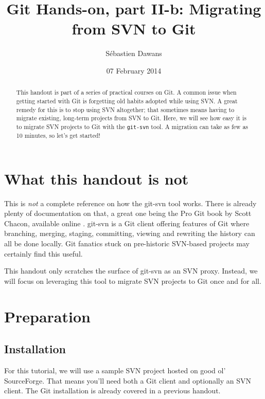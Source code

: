 \documentclass{../common/tufte-latex/tufte-handout}
\title{Git Hands-on, part II-b: Migrating from SVN to Git}
\author{S\'ebastien Dawans}
\date{07 February 2014} %
\begin{document}
\maketitle%

\begin{abstract}
\noindent
This handout is part of a series of practical courses on Git.
A common issue when getting started with Git is forgetting old habits adopted while using SVN.
A great remedy for this is to stop using SVN altogether; that sometimes means having to migrate existing, long-term projects from SVN to Git.
Here, we will see how easy it is to migrate SVN projects to Git with the \texttt{git-svn} tool.
A migration can take as few as 10 minutes, so let's get started!
\end{abstract}

\section{What this handout is not}

This is \textit{not} a complete reference on how the git-svn tool works.
There is already plenty of documentation on that, a great one being the Pro Git book by Scott Chacon, available online \cite{git-scm-ch8}.
git-svn is a Git client offering features of Git where branching, merging, staging, committing, viewing and rewriting the history can all be done locally.
Git fanatics stuck on pre-historic SVN-based projects may certainly find this useful.

This handout only scratches the surface of git-svn as an SVN proxy.
Instead, we will focus on leveraging this tool to migrate SVN projects to Git once and for all.

\section{Preparation}

\subsection{Installation}

For this tutorial, we will use a sample SVN project hosted on good ol' SourceForge. 
That means you'll need both a Git client and optionally an SVN client.
The Git installation is already covered in a previous handout.
\end{document}
